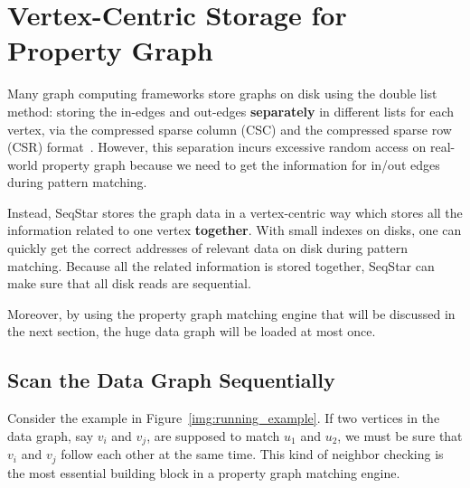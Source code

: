 \section{Vertex-Centric Storage for Property Graph}\label{sec:storage}

Many graph computing frameworks store graphs on disk using the double list method:
storing the in-edges and out-edges \textbf{separately} in different lists for each vertex,
via the compressed sparse column (CSC) and the compressed sparse row (CSR) format~\cite{DBLP:conf/sc/PearceGA10}.
However, this separation incurs excessive random access on real-world property graph because we need to get the information for in/out edges during pattern matching.

Instead, SeqStar stores the graph data in a vertex-centric way which stores all the information related to one vertex \textbf{together}.
With small indexes on disks, one can quickly get the correct addresses of relevant data on disk during pattern matching. Because all the related information is stored together, SeqStar can make sure that all disk reads are sequential.

Moreover, by using the property graph matching engine that will be discussed in the next section,
the huge data graph will be loaded at most once.
\subsection{Scan the Data Graph Sequentially}

Consider the example in Figure~\ref{img:running_example}.
If two vertices in the data graph, say $v_i$ and $v_j$, are supposed to match $u_1$ and $u_2$,
we must be sure that $v_i$ and $v_j$ follow each other at the same time.
This kind of neighbor checking is the most essential building block in a property graph matching engine.


